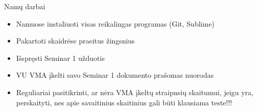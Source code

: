 \documentclass[11pt,xcolor=table]{beamer}
\begin{document}
\begin{frame} {Namų darbai}
\begin{itemize}
\item Namuose instaliuoti visas reikalingas programas (Git, Sublime)
\item Pakartoti skaidrėse praeitus žingsnius
\item Išspręsti Seminar 1 užduotis
\item VU VMA įkelti savo Seminar 1 dokumento prašomas nuorodas
\item Reguliariai pasitikrinti, ar nėra VMA įkeltų straipnsių skaitumui, jeigu yra, perskaityti, nes apie savaitinius skaitinius gali būti klausiama teste!!!

\end{itemize}
\end{frame}
\end{document}
